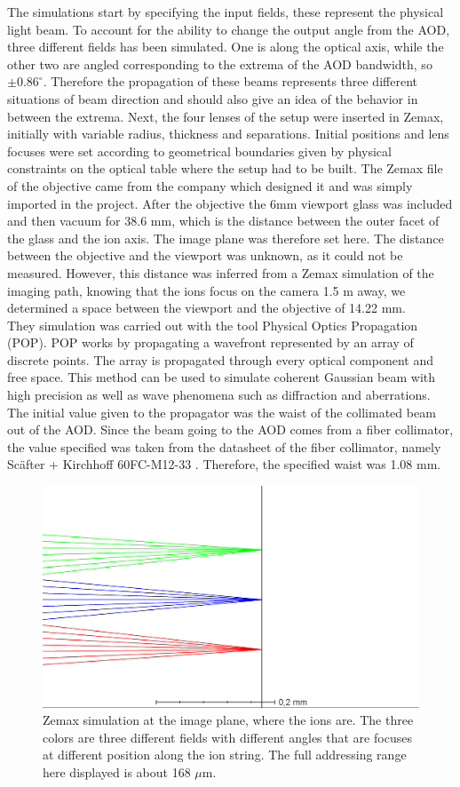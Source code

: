 The simulations start by specifying the input fields, these represent the physical light beam. To account for the ability to change the output angle from the AOD, three different fields has been simulated. One is along the optical axis, while the other two are angled corresponding to the extrema of the AOD bandwidth, so $\pm0.86^{\circ}$. Therefore the propagation of these beams represents three different situations of beam direction and should also give an idea of the behavior in between the extrema. Next, the four lenses of the setup were inserted in Zemax, initially with variable radius, thickness and separations. Initial positions and lens focuses were set according to geometrical boundaries given by physical constraints on the optical table where the setup had to be built. The Zemax file of the objective came from the company which designed it and was simply imported in the project. After the objective the 6mm viewport glass was included and then vacuum for 38.6 mm, which is the distance between the outer facet of the glass and the ion axis. The image plane was therefore set here. The distance between the objective and the viewport was unknown, as it could not be measured. However, this distance was inferred from a Zemax simulation of the imaging path, knowing that the ions focus on the camera 1.5 m away, we determined a space between the viewport and the objective of 14.22 mm.\\
They simulation was carried out with the tool Physical Optics Propagation (POP). POP works by propagating a wavefront represented by an array of discrete points. The array is propagated through every optical component and free space. This method can be used to simulate coherent Gaussian beam with high precision as well as wave phenomena such as diffraction and aberrations. The initial value given to the propagator was the waist of the collimated beam out of the AOD. Since the beam going to the AOD comes from a fiber collimator, the value specified was taken from the datasheet of the fiber collimator, namely Sc\"after + Kirchhoff 60FC-M12-33 \cite{fibercollimator}. Therefore, the specified waist was 1.08 mm.
\begin{figure}
     \centering
     \centering
     \includegraphics[width=.8\textwidth]{img/zemaxrange}
     \caption{Zemax simulation at the image plane, where the ions are. The three colors are three different fields with different angles that are focuses at different position along the ion string. The full addressing range here displayed is about 168 $\mu$m.}
     \label{zemaxrange}
\end{figure}

